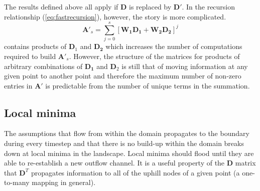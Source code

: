 \documentclass[draft,jgrga]{agu_template/AGUTeX}
\begin{document}
The results defined above all apply if $\bm{D}$ is replaced by $\bm{D'}$. In the recursion relationship (\ref{eq:fastrecursion}), however, the story is more complicated. \begin{equation}
    \bm{A'}_s = \sum_{j=0}^{s} \left[  \bm{\bm{W}_1 D_1 + \bm{W}_2 D_2} \right]^j
\end{equation}
contains products of $\bm{D}_1$ and $\bm{D_2}$ which increases the number of computations required to build $\bm{A'}_s$. However, the structure of the matrices for products of arbitrary combinations of $\bm{D_1}$ and $\bm{D}_2$ is still that of moving information at any given point to another point and therefore the maximum number of non-zero entries in $\bm{A'}$ is predictable from the number of unique terms in the summation.

\subsection{Local minima}

The assumptions that flow from within the domain propagates to the boundary during every timestep and that there is no build-up within the domain breaks down at local minima in the landscape. Local minima should flood until they are able to re-establish a new outflow channel. It is a useful property of the $\bm{D}$ matrix that $\bm{D}^T$ propagates information to all of the uphill nodes of a given point (a one-to-many mapping in general). 
	
\end{document}
